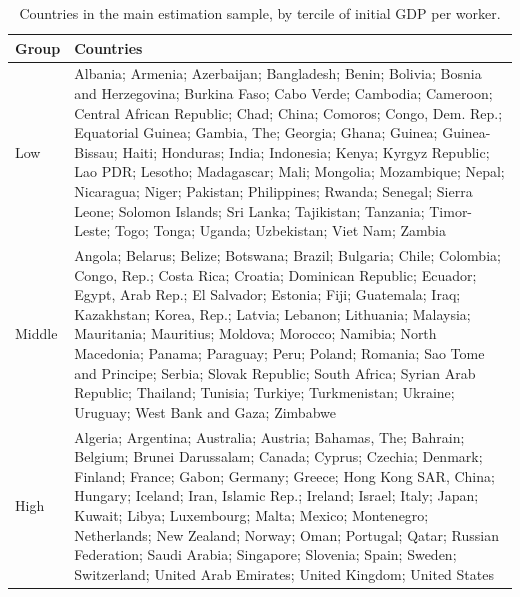 \documentclass[preprint,12pt,authoryear]{elsarticle}
\begin{document}
\begin{table}[!ht]
\centering
\begin{threeparttable}
\caption{Countries in the main estimation sample, by tercile of initial GDP per worker.}\label{tab:countries}
\footnotesize
\begin{tabular}{lp{}}
\toprule
Group & Countries\\
\midrule
Low & Albania; Armenia; Azerbaijan; Bangladesh; Benin; Bolivia; Bosnia and Herzegovina; Burkina Faso; Cabo Verde; Cambodia; Cameroon; Central African Republic; Chad; China; Comoros; Congo, Dem. Rep.; Equatorial Guinea; Gambia, The; Georgia; Ghana; Guinea; Guinea-Bissau; Haiti; Honduras; India; Indonesia; Kenya; Kyrgyz Republic; Lao PDR; Lesotho; Madagascar; Mali; Mongolia; Mozambique; Nepal; Nicaragua; Niger; Pakistan; Philippines; Rwanda; Senegal; Sierra Leone; Solomon Islands; Sri Lanka; Tajikistan; Tanzania; Timor-Leste; Togo; Tonga; Uganda; Uzbekistan; Viet Nam; Zambia\\
Middle & Angola; Belarus; Belize; Botswana; Brazil; Bulgaria; Chile; Colombia; Congo, Rep.; Costa Rica; Croatia; Dominican Republic; Ecuador; Egypt, Arab Rep.; El Salvador; Estonia; Fiji; Guatemala; Iraq; Kazakhstan; Korea, Rep.; Latvia; Lebanon; Lithuania; Malaysia; Mauritania; Mauritius; Moldova; Morocco; Namibia; North Macedonia; Panama; Paraguay; Peru; Poland; Romania; Sao Tome and Principe; Serbia; Slovak Republic; South Africa; Syrian Arab Republic; Thailand; Tunisia; Turkiye; Turkmenistan; Ukraine; Uruguay; West Bank and Gaza; Zimbabwe\\
High & Algeria; Argentina; Australia; Austria; Bahamas, The; Bahrain; Belgium; Brunei Darussalam; Canada; Cyprus; Czechia; Denmark; Finland; France; Gabon; Germany; Greece; Hong Kong SAR, China; Hungary; Iceland; Iran, Islamic Rep.; Ireland; Israel; Italy; Japan; Kuwait; Libya; Luxembourg; Malta; Mexico; Montenegro; Netherlands; New Zealand; Norway; Oman; Portugal; Qatar; Russian Federation; Saudi Arabia; Singapore; Slovenia; Spain; Sweden; Switzerland; United Arab Emirates; United Kingdom; United States\\
\bottomrule
\end{tabular}
\end{threeparttable}
\end{table}
\end{document}
